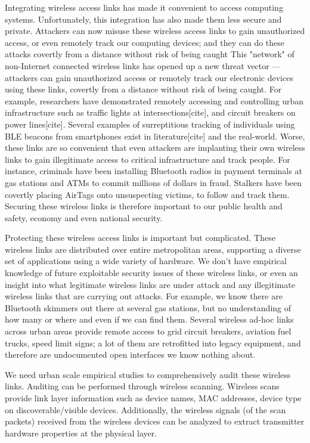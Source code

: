 Integrating wireless access links has made it convenient to access computing systems. 
%
Unfortunately, this integration has also made them less secure and private. 
%
Attackers can now misuse these wireless access links to gain unauthorized access, or even remotely track our computing devices; and they can do these attacks covertly from a distance without risk of being caught
%
This "network" of non-Internet connected wireless links has opened up a new threat vector --- attackers can gain unauthorized access or remotely track our electronic devices using these links, covertly from a distance without risk of being caught.
%
For example, researchers have demonstrated remotely accessing and controlling urban infrastructure such as traffic lights at intersections[cite], and circuit breakers on power lines[cite].
%
Several examples of surreptitious tracking of individuals using BLE beacons from smartphones exist in literature[cite] and the real-world.
%
Worse, these links are so convenient that even attackers are implanting their own wireless links to gain illegitimate access to critical infrastructure and track people.
%
For instance, criminals have been installing Bluetooth radios in payment terminals at gas stations and ATMs to commit millions of dollars in fraud.
%
Stalkers have been covertly placing AirTags onto unsuspecting victims, to follow and track them.
%
Securing these wireless links is therefore important to our public health and safety, economy and even national security.

Protecting these wireless access links is important but complicated.
%
These wireless links are distributed over entire metropolitan areas, supporting a diverse set of applications using a wide variety of hardware.
%
We don't have empirical knowledge of future exploitable security issues of these wireless links, or even an insight into what legitimate wireless links are under attack and any illegitimate wireless links that are carrying out attacks.
%
For example, we know there are Bluetooth skimmers out there at several gas stations, but no understanding of how many or where and even if we can find them.
%
Several wireless ad-hoc links across urban areas provide remote access to grid circuit breakers, aviation fuel trucks, speed limit signs; a lot of them are retrofitted into legacy equipment, and therefore are undocumented open interfaces we know nothing about.

We need urban scale empirical studies to comprehensively audit these wireless links.
%
Auditing can be performed through wireless scanning.
%
Wireless scans provide link layer information such as device names, MAC addresses, device type on discoverable/visible devices.
%
Additionally, the wireless signals (of the scan packets) received from the wireless devices can be analyzed to extract transmitter hardware properties at the physical layer.
%


